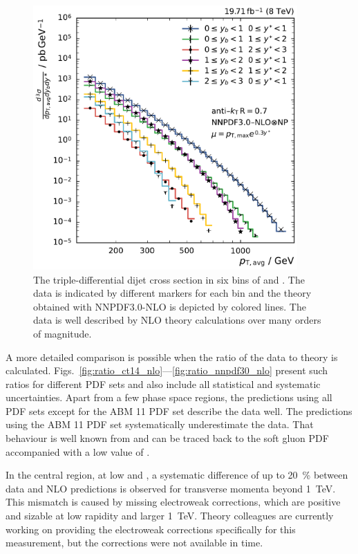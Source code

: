 \begin{figure}[h!tbp]
    \centering
    \includegraphics[width=0.9\textwidth]{figures/measurement/ptavg_spectrum.pdf}\hfill
    \caption[Spectrum of the Triple-differential Dijet Cross Section]{The
    triple-differential dijet cross section in six bins of \ystar and \yboost. The
    data is indicated by different markers for each bin and the theory obtained
    with NNPDF3.0-NLO is depicted by colored lines. The data is well described by
    NLO theory calculations over many orders of magnitude.}
    \label{fig:measurement_result}
\end{figure}

A more detailed comparison is possible when the ratio of the data to theory is
calculated. Figs.~\ref{fig:ratio_ct14_nlo}---\ref{fig:ratio_nnpdf30_nlo} present
such ratios for different PDF sets and also include all statistical and
systematic uncertainties. Apart from a few phase space regions, the predictions
using all PDF sets except for the ABM 11 PDF set describe the data well. The
predictions using the ABM 11 PDF set systematically underestimate the data.
That behaviour is well known \eg from \cite{Khachatryan:2014waa,Stober:2012abc} and can be traced
back to the soft gluon PDF accompanied with a low value of \asmz.

In the central region, at low \yboost and \ystar, a systematic difference of up
to \SI{20}{\percent} between data and NLO predictions is observed for transverse
momenta beyond \SI{1}{\TeV}. This mismatch is caused by missing electroweak
corrections, which are positive and sizable at low rapidity and \pt larger
\SI{1}{\TeV}. Theory colleagues are currently working on providing the
electroweak corrections specifically for this measurement, but the corrections
were not available in time.

